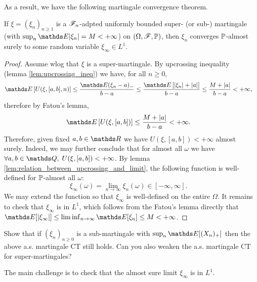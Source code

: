 As a result, we have the following martingale convergence theorem.
\begin{theorem} \label{thm:as_mart_ct}
If $\xi = (\xi_n)_{n\geq 1}$ is a $\mathcal{F}_n$-adpted uniformly bounded super- (or sub-) martingale (with $\sup_n \E|\xi_n| = M < +\infty$) on $(\Omega,\mathcal{F},\mathbb{P})$, then $\xi_n$ converges $\mathbb{P}$-almost surely to some random variable $\xi_\infty \in L^1$.
\end{theorem}

\begin{proof}
Assume wlog that $\xi$ is a super-martingale. By upcrossing inequality (lemma \ref{lem:upcrossing_ineq}) we have, for all $n \geq 0$,
\begin{equation}
    \E\sqbracket{U(\xi,[a,b],n)} \leq \frac{\E(\xi_n - a)_-}{b-a} \leq \frac{\E\sqbracket{\abs{\xi_n}+\abs{a}}}{b-a} \leq \frac{M+\abs{a}}{b-a} < +\infty,
\end{equation}
therefore by Fatou's lemma,
\begin{equation}
    \E\sqbracket{U(\xi,[a,b])} \leq \frac{M+\abs{a}}{b-a} < +\infty.
\end{equation}
Therefore, given fixed $a,b \in \R$ we have $U(\xi,[a,b])<+\infty$ almost surely. Indeed, we may further conclude that for almost all $\omega$ we have $\forall a,b \in \Q, \; U(\xi,[a,b])<+\infty$. By lemma \ref{lem:relation_between_upcrossing_and_limit}, the following function is well-defined for $\mathbb{P}$-almost all $\omega$:
\begin{equation}
    \xi_\infty(\omega) = \lim_{n\to\infty} \xi_n(\omega) \in [-\infty,\infty].
\end{equation}
We may extend the function so that $\xi_\infty$ is well-defined on the entire $\Omega$. It remains to check that $\xi_\infty$ is in $L^1$, which follows from the Fatou's lemma directly that $\E[\abs{\xi_\infty}] \leq \liminf_{n\to\infty} \E[\xi_n] \leq M < +\infty$.
\end{proof}

\begin{exercise}
Show that if $(\xi_n)_{n\geq 0}$ is a sub-martingale with $\sup_{n} \E[(X_n)_+]$ then the above a.s. martingale CT still holds. Can you also weaken the a.s. martingale CT for super-martingales?
\end{exercise}

\begin{hint}
The main challenge is to check that the almost sure limit $\xi_\infty$ is in $L^1$.
\end{hint}

